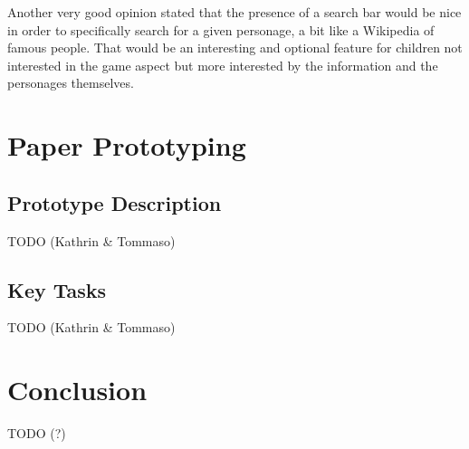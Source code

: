 \documentclass[12pt]{scrartcl}
\begin{document}
		Another very good opinion stated that the presence of a search bar would be nice in order to specifically search for a given personage, a bit like a Wikipedia of famous people. That would be an interesting and optional feature for children not interested in the game aspect but more interested by the information and the personages themselves.

	
\section{Paper Prototyping}

	\subsection{Prototype Description}

		
		TODO (Kathrin \& Tommaso)
		
	\subsection{Key Tasks}
	
	
		TODO (Kathrin \& Tommaso)
			
\section{Conclusion}

	
	TODO (?)
\end{document}
